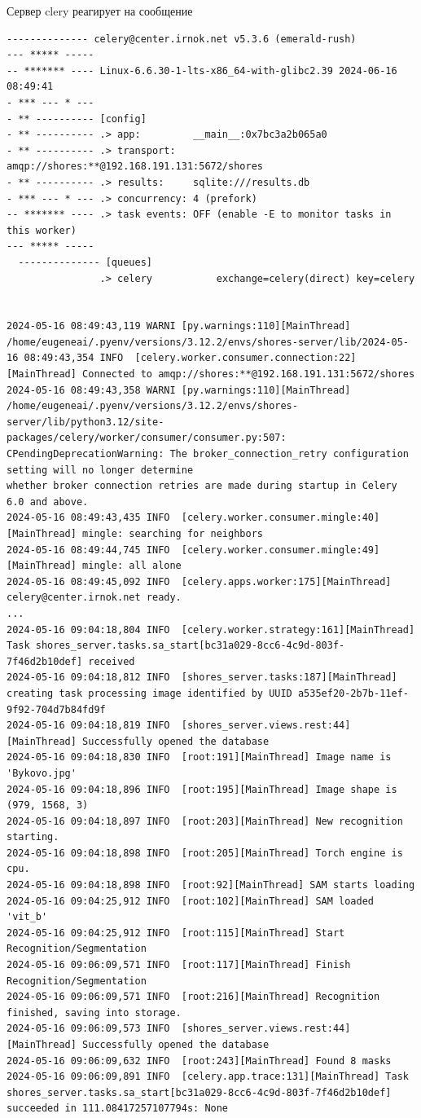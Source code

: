 \documentclass[732,14pt,final]{studrep}
\begin{document}
Сервер clery реагирует на сообщение
\begin{verbatim}
-------------- celery@center.irnok.net v5.3.6 (emerald-rush)
--- ***** -----
-- ******* ---- Linux-6.6.30-1-lts-x86_64-with-glibc2.39 2024-06-16 08:49:41
- *** --- * ---
- ** ---------- [config]
- ** ---------- .> app:         __main__:0x7bc3a2b065a0
- ** ---------- .> transport:   amqp://shores:**@192.168.191.131:5672/shores
- ** ---------- .> results:     sqlite:///results.db
- *** --- * --- .> concurrency: 4 (prefork)
-- ******* ---- .> task events: OFF (enable -E to monitor tasks in this worker)
--- ***** -----
  -------------- [queues]
                .> celery           exchange=celery(direct) key=celery


2024-05-16 08:49:43,119 WARNI [py.warnings:110][MainThread] /home/eugeneai/.pyenv/versions/3.12.2/envs/shores-server/lib/2024-05-16 08:49:43,354 INFO  [celery.worker.consumer.connection:22][MainThread] Connected to amqp://shores:**@192.168.191.131:5672/shores
2024-05-16 08:49:43,358 WARNI [py.warnings:110][MainThread] /home/eugeneai/.pyenv/versions/3.12.2/envs/shores-server/lib/python3.12/site-packages/celery/worker/consumer/consumer.py:507: CPendingDeprecationWarning: The broker_connection_retry configuration setting will no longer determine
whether broker connection retries are made during startup in Celery 6.0 and above.
2024-05-16 08:49:43,435 INFO  [celery.worker.consumer.mingle:40][MainThread] mingle: searching for neighbors
2024-05-16 08:49:44,745 INFO  [celery.worker.consumer.mingle:49][MainThread] mingle: all alone
2024-05-16 08:49:45,092 INFO  [celery.apps.worker:175][MainThread] celery@center.irnok.net ready.
...
2024-05-16 09:04:18,804 INFO  [celery.worker.strategy:161][MainThread] Task shores_server.tasks.sa_start[bc31a029-8cc6-4c9d-803f-7f46d2b10def] received
2024-05-16 09:04:18,812 INFO  [shores_server.tasks:187][MainThread] creating task processing image identified by UUID a535ef20-2b7b-11ef-9f92-704d7b84fd9f
2024-05-16 09:04:18,819 INFO  [shores_server.views.rest:44][MainThread] Successfully opened the database
2024-05-16 09:04:18,830 INFO  [root:191][MainThread] Image name is 'Bykovo.jpg'
2024-05-16 09:04:18,896 INFO  [root:195][MainThread] Image shape is (979, 1568, 3)
2024-05-16 09:04:18,897 INFO  [root:203][MainThread] New recognition starting.
2024-05-16 09:04:18,898 INFO  [root:205][MainThread] Torch engine is cpu.
2024-05-16 09:04:18,898 INFO  [root:92][MainThread] SAM starts loading
2024-05-16 09:04:25,912 INFO  [root:102][MainThread] SAM loaded 'vit_b'
2024-05-16 09:04:25,912 INFO  [root:115][MainThread] Start Recognition/Segmentation
2024-05-16 09:06:09,571 INFO  [root:117][MainThread] Finish Recognition/Segmentation
2024-05-16 09:06:09,571 INFO  [root:216][MainThread] Recognition finished, saving into storage.
2024-05-16 09:06:09,573 INFO  [shores_server.views.rest:44][MainThread] Successfully opened the database
2024-05-16 09:06:09,632 INFO  [root:243][MainThread] Found 8 masks
2024-05-16 09:06:09,891 INFO  [celery.app.trace:131][MainThread] Task shores_server.tasks.sa_start[bc31a029-8cc6-4c9d-803f-7f46d2b10def] succeeded in 111.08417257107794s: None
\end{verbatim}
\end{document}
